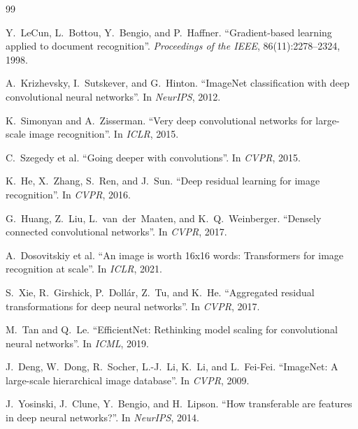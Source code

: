 \documentclass[11pt,a4paper,oneside]{report}
\begin{document}
\begin{thebibliography}{99}

Y.~LeCun, L.~Bottou, Y.~Bengio, and P.~Haffner.
\newblock ``Gradient-based learning applied to document recognition''.
\newblock \emph{Proceedings of the IEEE}, 86(11):2278--2324, 1998.

A.~Krizhevsky, I.~Sutskever, and G.~Hinton.
\newblock ``ImageNet classification with deep convolutional neural networks''.
\newblock In \emph{NeurIPS}, 2012.

K.~Simonyan and A.~Zisserman.
\newblock ``Very deep convolutional networks for large-scale image recognition''.
\newblock In \emph{ICLR}, 2015.

C.~Szegedy et al.
\newblock ``Going deeper with convolutions''.
\newblock In \emph{CVPR}, 2015.

K.~He, X.~Zhang, S.~Ren, and J.~Sun.
\newblock ``Deep residual learning for image recognition''.
\newblock In \emph{CVPR}, 2016.

G.~Huang, Z.~Liu, L.~van~der~Maaten, and K.~Q.~Weinberger.
\newblock ``Densely connected convolutional networks''.
\newblock In \emph{CVPR}, 2017.

A.~Dosovitskiy et al.
\newblock ``An image is worth 16x16 words: Transformers for image recognition at scale''.
\newblock In \emph{ICLR}, 2021.

S.~Xie, R.~Girshick, P.~Doll\'ar, Z.~Tu, and K.~He.
\newblock ``Aggregated residual transformations for deep neural networks''.
\newblock In \emph{CVPR}, 2017.

M.~Tan and Q.~Le.
\newblock ``EfficientNet: Rethinking model scaling for convolutional neural networks''.
\newblock In \emph{ICML}, 2019.

J.~Deng, W.~Dong, R.~Socher, L.-J.~Li, K.~Li, and L.~Fei-Fei.
\newblock ``ImageNet: A large-scale hierarchical image database''.
\newblock In \emph{CVPR}, 2009.

J.~Yosinski, J.~Clune, Y.~Bengio, and H.~Lipson.
\newblock ``How transferable are features in deep neural networks?''.
\newblock In \emph{NeurIPS}, 2014.


\end{thebibliography}
\end{document}

